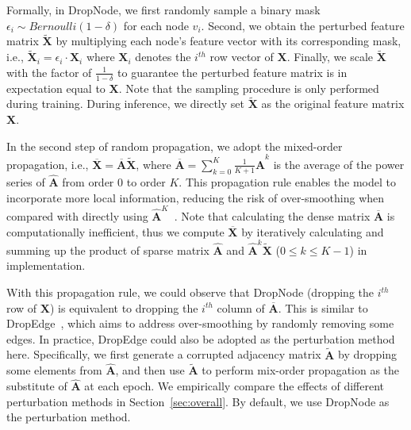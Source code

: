 Formally, in DropNode, we first 
randomly sample a binary mask $\epsilon_i \sim Bernoulli(1-\delta)$ for each node $v_i$.
Second, we obtain the perturbed feature matrix $\widetilde{\mathbf{X}}$ by multiplying each node's feature vector with its corresponding mask, i.e., $\widetilde{\mathbf{X}}_i=\epsilon_i \cdot \mathbf{X}_i$ where $\mathbf{X}_i$ denotes the $i^{th}$ row vector of $\mathbf{X}$. 
Finally,  we scale $\widetilde{\mathbf{X}}$ with the factor of $\frac{1}{1-\delta}$ to guarantee the perturbed feature matrix is in expectation equal to $\mathbf{X}$. 
Note that the sampling procedure is only performed during training. 
During inference, we directly set $\widetilde{\mathbf{X}}$ as the original feature matrix $\mathbf{X}$. 


In the second step of random propagation, we adopt the mixed-order propagation, i.e., $\overline{\mathbf{X}} = \overline{\mathbf{A}} \widetilde{\mathbf{X}}$, where  $\overline{\mathbf{A}} =  \sum_{k=0}^K\frac{1}{K+1}\hat{\mathbf{A}}^k$ is the average of the power series of $\hat{\mathbf{A}}$ from order 0 to order $K$. 
This propagation rule enables the model to incorporate more local information, reducing the risk of over-smoothing when compared with directly using $\hat{\mathbf{A}}^K$~\cite{abu2019mixhop,xu2018representation}. Note that calculating the dense matrix $\overline{\mathbf{A}}$ is computationally inefficient, thus we compute $\overline{\mathbf{X}}$ by iteratively calculating and summing up the product of  sparse matrix $\hat{\mathbf{A}}$ and $\hat{\mathbf{A}}^{k}\widetilde{\mathbf{X}}$ ($0\leq k \leq K-1$) in implementation.


With this propagation rule, we could observe that DropNode (dropping the $i^{th}$ row of $\mathbf{X}$) is equivalent to dropping the $i^{th}$ column of $\overline{\mathbf{A}}$. This is similar to DropEdge~\cite{YuDropedge}, which aims to address over-smoothing by randomly removing some edges. In practice, DropEdge could also be adopted as the perturbation method here. Specifically, we first generate a corrupted adjacency matrix $\tilde{\mathbf{A}}$ by dropping some elements from $\hat{\mathbf{A}}$, and then use $\tilde{\mathbf{A}}$ to perform mix-order propagation as the substitute of $\hat{\mathbf{A}}$  at each epoch. We empirically compare the effects of different perturbation methods in Section~\ref{sec:overall}. By default, we use DropNode as the perturbation method. 



